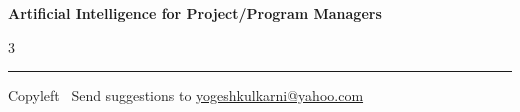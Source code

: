 \documentclass[8pt,landscape]{article}
\begin{document}
\footnotesize


\begin{center}
\Large{\textbf{Artificial Intelligence for Project/Program Managers}} %
\end{center}

\begin{multicols}{3}

\end{multicols}

\rule{\linewidth}{0.25pt}
\scriptsize
Copyleft \textcopyleft\  Send suggestions to
\href{http://yati.io}{yogeshkulkarni@yahoo.com}
\end{document}
